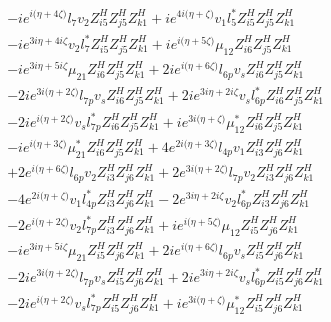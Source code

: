 \begin{align}
 &-i e^{i \Big(\eta +4 \zeta \Big)} l_7 v_2 Z_{{i 5}}^{H} Z_{{j 5}}^{H} Z_{{k 1}}^{H} +i e^{4 i \Big(\eta +\zeta \Big)} v_1 l_5^* Z_{{i 5}}^{H} Z_{{j 5}}^{H} Z_{{k 1}}^{H} \nonumber \\ 
 &-i e^{3 i \eta +4 i \zeta } v_2 l_7^* Z_{{i 5}}^{H} Z_{{j 5}}^{H} Z_{{k 1}}^{H} +i e^{i \Big(\eta +5 \zeta \Big)} \mu_{12} Z_{{i 6}}^{H} Z_{{j 5}}^{H} Z_{{k 1}}^{H} \nonumber \\ 
 &-i e^{3 i \eta +5 i \zeta } \mu_{21} Z_{{i 6}}^{H} Z_{{j 5}}^{H} Z_{{k 1}}^{H} +2 i e^{i \Big(\eta +6 \zeta \Big)} l_{6p} v_s Z_{{i 6}}^{H} Z_{{j 5}}^{H} Z_{{k 1}}^{H} \nonumber \\ 
 &-2 i e^{3 i \Big(\eta +2 \zeta \Big)} l_{7p} v_s Z_{{i 6}}^{H} Z_{{j 5}}^{H} Z_{{k 1}}^{H} +2 i e^{3 i \eta +2 i \zeta } v_s l_{6p}^* Z_{{i 6}}^{H} Z_{{j 5}}^{H} Z_{{k 1}}^{H} \nonumber \\ 
 &-2 i e^{i \Big(\eta +2 \zeta \Big)} v_s l_{7p}^* Z_{{i 6}}^{H} Z_{{j 5}}^{H} Z_{{k 1}}^{H} +i e^{3 i \Big(\eta +\zeta \Big)} \mu_{12}^* Z_{{i 6}}^{H} Z_{{j 5}}^{H} Z_{{k 1}}^{H} \nonumber \\ 
 &-i e^{i \Big(\eta +3 \zeta \Big)} \mu_{21}^* Z_{{i 6}}^{H} Z_{{j 5}}^{H} Z_{{k 1}}^{H} +4 e^{2 i \Big(\eta +3 \zeta \Big)} l_{4p} v_1 Z_{{i 3}}^{H} Z_{{j 6}}^{H} Z_{{k 1}}^{H} \nonumber \\ 
 &+2 e^{i \Big(\eta +6 \zeta \Big)} l_{6p} v_2 Z_{{i 3}}^{H} Z_{{j 6}}^{H} Z_{{k 1}}^{H} +2 e^{3 i \Big(\eta +2 \zeta \Big)} l_{7p} v_2 Z_{{i 3}}^{H} Z_{{j 6}}^{H} Z_{{k 1}}^{H} \nonumber \\ 
 &-4 e^{2 i \Big(\eta +\zeta \Big)} v_1 l_{4p}^* Z_{{i 3}}^{H} Z_{{j 6}}^{H} Z_{{k 1}}^{H} -2 e^{3 i \eta +2 i \zeta } v_2 l_{6p}^* Z_{{i 3}}^{H} Z_{{j 6}}^{H} Z_{{k 1}}^{H} \nonumber \\ 
 &-2 e^{i \Big(\eta +2 \zeta \Big)} v_2 l_{7p}^* Z_{{i 3}}^{H} Z_{{j 6}}^{H} Z_{{k 1}}^{H} +i e^{i \Big(\eta +5 \zeta \Big)} \mu_{12} Z_{{i 5}}^{H} Z_{{j 6}}^{H} Z_{{k 1}}^{H} \nonumber \\ 
 &-i e^{3 i \eta +5 i \zeta } \mu_{21} Z_{{i 5}}^{H} Z_{{j 6}}^{H} Z_{{k 1}}^{H} +2 i e^{i \Big(\eta +6 \zeta \Big)} l_{6p} v_s Z_{{i 5}}^{H} Z_{{j 6}}^{H} Z_{{k 1}}^{H} \nonumber \\ 
 &-2 i e^{3 i \Big(\eta +2 \zeta \Big)} l_{7p} v_s Z_{{i 5}}^{H} Z_{{j 6}}^{H} Z_{{k 1}}^{H} +2 i e^{3 i \eta +2 i \zeta } v_s l_{6p}^* Z_{{i 5}}^{H} Z_{{j 6}}^{H} Z_{{k 1}}^{H} \nonumber \\ 
 &-2 i e^{i \Big(\eta +2 \zeta \Big)} v_s l_{7p}^* Z_{{i 5}}^{H} Z_{{j 6}}^{H} Z_{{k 1}}^{H} +i e^{3 i \Big(\eta +\zeta \Big)} \mu_{12}^* Z_{{i 5}}^{H} Z_{{j 6}}^{H} Z_{{k 1}}^{H} \nonumber \\ 

\end{align}
